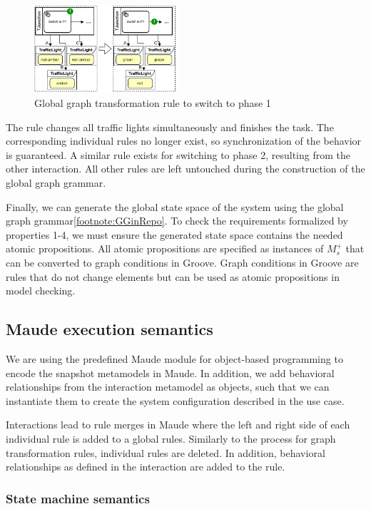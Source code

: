 \documentclass{jot}
\begin{document}
\begin{figure}[h]
    \centering
    \includegraphics[width=0.475\textwidth]{figures/parallel_rule.pdf}
    \caption{Global graph transformation rule to switch to phase 1}
    \label{fig:parallel_rule}
\end{figure}

The rule changes all traffic lights simultaneously and finishes the task.
The corresponding individual rules no longer exist, so synchronization of the behavior is guaranteed.
A similar rule exists for switching to phase 2, resulting from the other interaction.
All other rules are left untouched during the construction of the global graph grammar.

Finally, we can generate the global state space of the system using the global graph grammar\cref{footnote:GGinRepo}.
To check the requirements formalized by properties 1-4, we must ensure the generated state space contains the needed atomic propositions.
All atomic propositions are specified as instances of $M_s^+$ that can be converted to graph conditions in Groove.
Graph conditions in Groove are rules that do not change elements but can be used as atomic propositions in model checking.

\subsection{Maude execution semantics} \label{sec:maude_execution_semantics}
We are using the predefined Maude module for object-based programming to encode the snapshot metamodels in Maude.
In addition, we add behavioral relationships from the interaction metamodel as objects, such that we can instantiate them to create the system configuration described in the use case.

Interactions lead to rule merges in Maude where the left and right side of each individual rule is added to a global rules.
Similarly to the process for graph transformation rules, individual rules are deleted.
In addition, behavioral relationships as defined in the interaction are added to the rule.

\subsubsection{State machine semantics}
\end{document}
